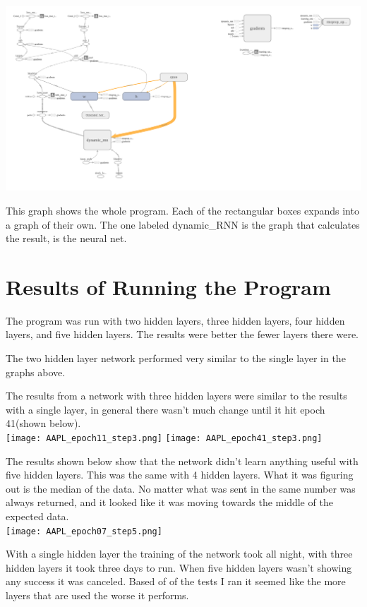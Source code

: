 \documentclass{article}
\begin{document}
\includegraphics[width=\textwidth]{png.png}

This graph shows the whole program. Each of the rectangular boxes expands into a graph of their own. The one labeled dynamic\_RNN is the graph that calculates the result, is the neural net.

\section{Results of Running the Program}
The program was run with two hidden layers, three hidden layers, four hidden layers, and five hidden layers. 
The results were better the fewer layers there were.

The two hidden layer network performed very similar to the single layer in the graphs above. 

The results from a network with three hidden layers were similar to the results with a single layer, in general there wasn't much change until it hit epoch 41(shown below). \\


\texttt{[image: AAPL\_epoch11\_step3.png]}
\texttt{[image: AAPL\_epoch41\_step3.png]}


The results shown below show that the network didn't learn anything useful with five hidden layers. 
This was the same with 4 hidden layers.
What it was figuring out is the median of the data.
No matter what was sent in the same number was always returned, and it looked like it was moving towards the middle of the expected data. \\


\texttt{[image: AAPL\_epoch07\_step5.png]}

With a single hidden layer the training of the network took all night, with three hidden layers it took three days to run. 
When five hidden layers wasn't showing any success it was canceled. 
Based of of the tests I ran it seemed like the more layers that are used the worse it performs.
\end{document}
